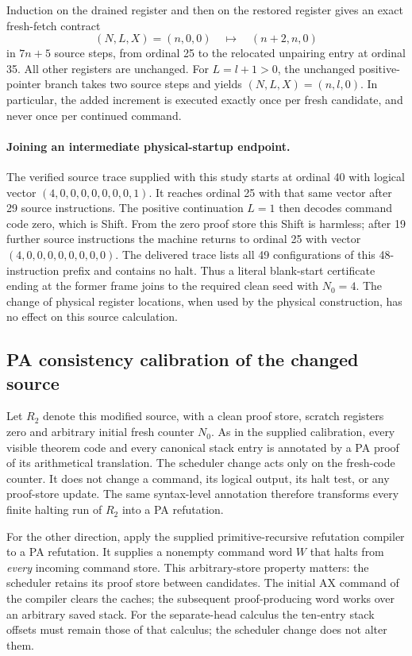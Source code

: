 Induction on the drained register and then on the restored register gives
an exact fresh-fetch contract
\[
 (N,L,X)=(n,0,0)\quad\longmapsto\quad(n+2,n,0)
\]
in $7n+5$ source steps, from ordinal 25 to the relocated unpairing
entry at ordinal 35. All other registers are unchanged. For $L=l+1>0$,
the unchanged positive-pointer branch takes two source steps and yields
$(N,L,X)=(n,l,0)$. In particular, the added increment is executed exactly
once per fresh candidate, and never once per continued command.

\paragraph{Joining an intermediate physical-startup endpoint.}
The verified source trace supplied with this study starts at ordinal 40
with logical vector $(4,0,0,0,0,0,0,0,1)$. It reaches ordinal 25 with
that same vector after 29 source instructions. The positive continuation
$L=1$ then decodes command code zero, which is Shift. From the zero proof
store this Shift is harmless; after 19 further source instructions the
machine returns to ordinal 25 with vector $(4,0,0,0,0,0,0,0,0)$.
The delivered trace lists all 49 configurations of this 48-instruction
prefix and contains no halt. Thus a literal blank-start certificate ending
at the former frame joins to the required clean seed with $N_0=4$.
The change of physical register locations, when used by the physical
construction, has no effect on this source calculation.

\subsection{PA consistency calibration of the changed source}

Let $R_2$ denote this modified source, with a clean proof store, scratch
registers zero and arbitrary initial fresh counter $N_0$. As in the
supplied calibration, every visible theorem code and every canonical
stack entry is annotated by a PA proof of its arithmetical translation.
The scheduler change acts only on the fresh-code counter. It does not
change a command, its logical output, its halt test, or any proof-store
update. The same syntax-level annotation therefore transforms every
finite halting run of $R_2$ into a PA refutation.

For the other direction, apply the supplied primitive-recursive
refutation compiler to a PA refutation. It supplies a nonempty command
word $W$ that halts from \emph{every} incoming command store. This
arbitrary-store property matters: the scheduler retains its proof store
between candidates. The initial AX command of the compiler clears the
caches; the subsequent proof-producing word works over an arbitrary
saved stack. For the separate-head calculus the ten-entry stack offsets
must remain those of that calculus; the scheduler change does not alter
them.

